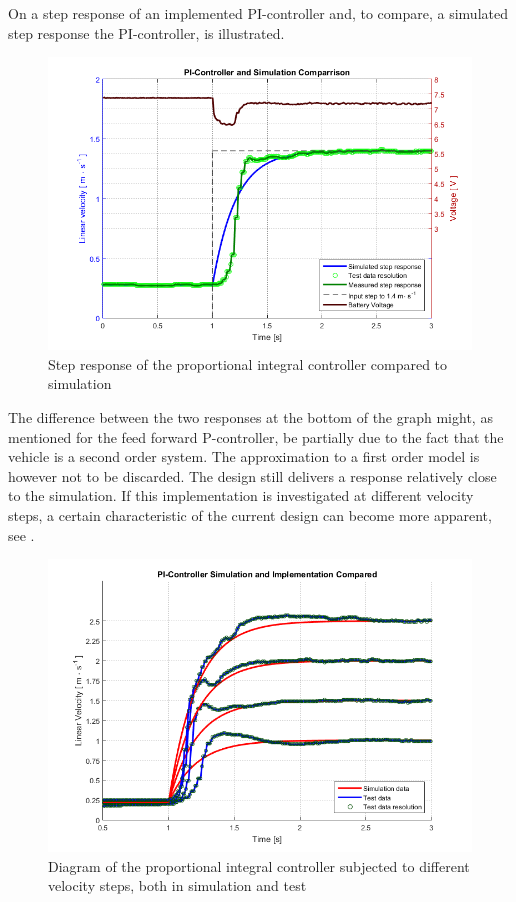 On  a step response of an implemented PI-controller and, to compare, a simulated step response the PI-controller, is illustrated.
%
\begin{figure}[H]
 	\centering
 	\includegraphics[width=.9\textwidth]{figures/PIcontrollerStepRealVsSim}
 	\caption{Step response of the proportional integral controller compared to simulation}
 	\label{fig:PIcontrollerStepRealVsSim}
\end{figure}
%
The difference between the two responses at the bottom of the graph might, as mentioned for the feed forward P-controller, be partially due to the fact that the vehicle is a second order system. The approximation to a first order model is however not to be discarded. The design still delivers a response relatively close to the simulation.
If this implementation is investigated at different velocity steps, a certain characteristic of the current design can become more apparent, see .
%
\begin{figure}[H]
 	\centering
 	\includegraphics[width=.9\textwidth]{figures/multiStepPInew}
 	\caption{Diagram of the proportional integral controller subjected to different velocity steps, both in simulation and test}
 	\label{fig:multiStepPI}
\end{figure}
